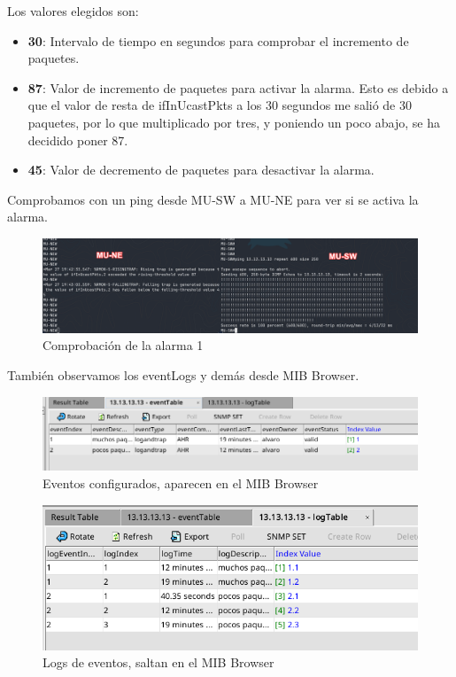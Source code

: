 \documentclass[11pt]{article}
\begin{document}
Los valores elegidos son:

\begin{itemize}
    \item \textbf{30}: Intervalo de tiempo en segundos para comprobar el incremento de paquetes.
    \item \textbf{87}: Valor de incremento de paquetes para activar la alarma. Esto es debido a que el valor de resta de ifInUcastPkts a los 30 segundos me salió de 30 paquetes, por lo que multiplicado por tres, y poniendo un poco abajo, se ha decidido poner 87.
    \item \textbf{45}: Valor de decremento de paquetes para desactivar la alarma.
\end{itemize}

Comprobamos con un ping desde MU-SW a MU-NE para ver si se activa la alarma.

\begin{figure}[h]
    \centering
    \includegraphics[width=\textwidth]{src/alarm1.png}
    \caption{Comprobación de la alarma 1}
\end{figure}

También observamos los eventLogs y demás desde MIB Browser.

\begin{figure}[h]
    \centering
    \includegraphics[width=\textwidth]{src/eventsmibs.png}
    \caption{Eventos configurados, aparecen en el MIB Browser}
\end{figure}
\begin{figure}[h]
    \centering
    \includegraphics[width=\textwidth]{src/eventlogsmibs.png}
    \caption{Logs de eventos, saltan en el MIB Browser}
\end{figure}
\end{document}
